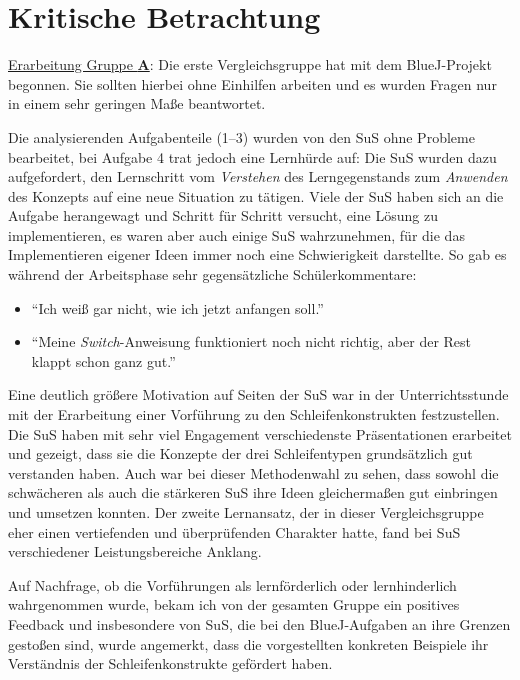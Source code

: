 \documentclass[paper=a4, DIV=13, BCOR=12mm, twoside=on, onecolumn=on, open = any, titlepage =on, parskip =half-, headsepline = on, footsepline = on, chapterprefix = on, sectionprefix = on, appendixprefix = off, fontsize = 12pt, numbers = noenddot, abstract = off]{scrreprt}
\begin{document}
\par \singlespacing
\section{Kritische Betrachtung}
\label{kritische betrachtung}
\onehalfspacing

\underline{Erarbeitung Gruppe \textsc{\textbf{A}}}: Die erste Vergleichsgruppe hat mit dem BlueJ-Projekt begonnen. Sie sollten hierbei ohne Einhilfen arbeiten und es wurden Fragen nur in einem sehr geringen Maße beantwortet. 

Die analysierenden Aufgabenteile (1--3) wurden von den SuS ohne Probleme bearbeitet, bei Aufgabe 4 trat jedoch eine Lernhürde auf: Die SuS wurden dazu aufgefordert, den Lernschritt vom \emph{Verstehen} des Lerngegenstands zum \emph{Anwenden} des Konzepts auf eine neue Situation zu tätigen. Viele der SuS haben sich an die Aufgabe herangewagt und Schritt für Schritt versucht, eine Lösung zu implementieren, es waren aber auch einige SuS wahrzunehmen, für die das Implementieren eigener Ideen immer noch eine Schwierigkeit darstellte. So gab es während der Arbeitsphase sehr gegensätzliche Schülerkommentare:

\singlespacing
\begin{itemize}
\item "`Ich weiß gar nicht, wie ich jetzt anfangen soll."'
\item "`Meine \emph{Switch}-Anweisung funktioniert noch nicht richtig, aber der Rest klappt schon ganz gut."'
\end{itemize}
\onehalfspacing

Eine deutlich größere Motivation auf Seiten der SuS war in der Unterrichtsstunde mit der Erarbeitung einer Vorführung zu den Schleifenkonstrukten festzustellen. Die SuS haben mit sehr viel Engagement verschiedenste Präsentationen erarbeitet und gezeigt, dass sie die Konzepte der drei Schleifentypen grundsätzlich gut verstanden haben. Auch war bei dieser Methodenwahl zu sehen, dass sowohl die schwächeren als auch die stärkeren SuS ihre Ideen gleichermaßen gut einbringen und umsetzen konnten.
Der zweite Lernansatz, der in dieser Vergleichsgruppe eher einen vertiefenden und überprüfenden Charakter hatte, fand bei SuS verschiedener Leistungsbereiche Anklang.

Auf Nachfrage, ob die Vorführungen als lernförderlich oder lernhinderlich wahrgenommen wurde, bekam ich von der gesamten Gruppe ein positives Feedback und insbesondere von SuS, die bei den BlueJ-Aufgaben an ihre Grenzen gestoßen sind, wurde angemerkt, dass die vorgestellten konkreten Beispiele ihr Verständnis der Schleifenkonstrukte gefördert haben.
\end{document}
